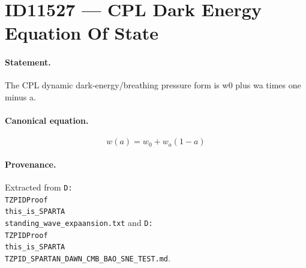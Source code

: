 \section*{ID11527 --- CPL Dark Energy Equation Of State}

\paragraph{Statement.}
The CPL dynamic dark-energy/breathing pressure form is w0 plus wa times one minus a.

\paragraph{Canonical equation.}
\[
w(a)=w_0+w_a(1-a)
\]

\paragraph{Provenance.}
Extracted from \texttt{D:\\TZPIDProof\\this\_is\_SPARTA\\standing\_wave\_expaansion.txt} and \texttt{D:\\TZPIDProof\\this\_is\_SPARTA\\TZPID\_SPARTAN\_DAWN\_CMB\_BAO\_SNE\_TEST.md}.
